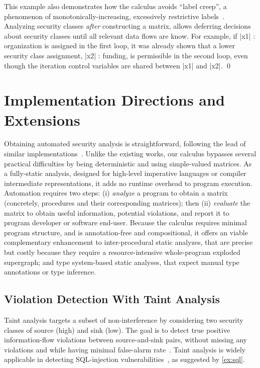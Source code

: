 \begin{example}
This example also demonstrates how the calculus avoids \enquote{label creep}, a phenomenon of monotonically-increasing, excessively restrictive labels~\cite{sabelfeld2003}.
Analyzing security classes \emph{after} constructing a matrix, allows deferring decisions about security classes until all relevant data flows are know.
For example, if \prc|x1| : organization is assigned in the first loop, it was already shown that a lower security class assignment, \prc|x2| : funding, is permissible in the second loop, even though the iteration control variables are shared between \prc|x1| and \prc|x2|.
\qed
\end{example}


\tocless\section{Implementation Directions and Extensions}
\label{sec:implementation}

Obtaining automated security analysis is straightforward, following the lead of similar implementations~\cite{Aubert2022l,Moyen2017}.
Unlike the existing works, our calculus bypasses several practical difficulties by being deterministic and using simple-valued matrices.
As a fully-static analysis, designed for high-level imperative languages or compiler intermediate representations, it adds no runtime overhead to program execution.
Automation requires two steps:
(i) \emph{analyze} a program to obtain a matrix (concretely, procedures and their corresponding matrices); then
(ii) \emph{evaluate} the matrix to obtain useful information, \eg potential violations, and report it to program developer or software end-user.
Because the calculus requires minimal program structure, and is annotation-free and compositional, it offers an viable complementary enhancement to
\eg inter-procedural static analyzes, that are precise but costly because they require a resource-intensive whole-program exploded supergraph;
and type system-based static analyses, that expect manual type annotations or type inference.


\tocless\subsection{Violation Detection With Taint Analysis}

Taint analysis targets a subset of non-interference by considering two security classes of source (high) and sink (low).
The goal is to detect true positive information-flow violations between source-and-sink pairs, without missing any violations and while having minimal false-alarm rate~\cite{pauck2018}.
Taint analysis is widely applicable in \eg detecting SQL-injection vulnerabilities~\cite{huang2014}, as suggested by \autoref{ex:sql}.

